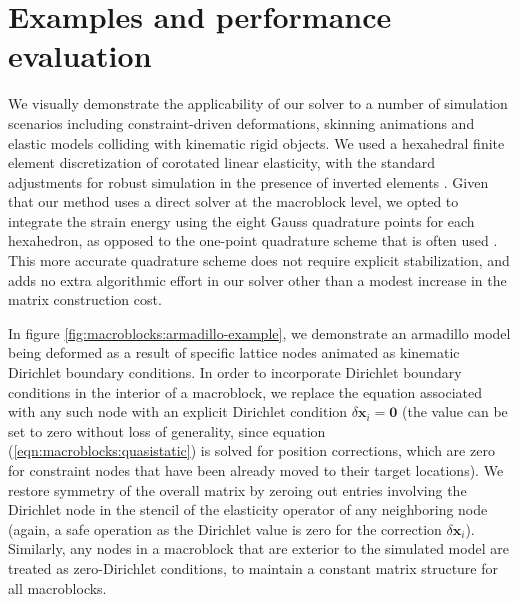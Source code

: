 
\section{Examples and performance evaluation}
\label{sec:macroblocks:examples}

We visually demonstrate the applicability of our solver to a number of
simulation scenarios including constraint-driven deformations,
skinning animations and elastic models colliding with kinematic rigid
objects.  We used a hexahedral finite element discretization of
corotated linear elasticity, with the standard adjustments for robust
simulation in the presence of inverted elements
\citep{IrvinTF:2004}. Given that our method uses a direct solver at the
macroblock level, we opted to integrate the strain energy using the
eight Gauss quadrature points for each hexahedron, as opposed to the
one-point quadrature scheme that is often used
\citep{McAdaZSETTS:2011,PatteMS:2012}. This more accurate quadrature
scheme does not require explicit stabilization, and adds no extra
algorithmic effort in our solver other than a modest increase in the
matrix construction cost.

In figure \ref{fig:macroblocks:armadillo-example}, we demonstrate an armadillo
model being deformed as a result of specific lattice nodes animated as
kinematic Dirichlet boundary conditions. In order to incorporate
Dirichlet boundary conditions in the interior of a macroblock, we
replace the equation associated with any such node with an explicit
Dirichlet condition $\delta\mathbf{x}_i=\mathbf{0}$ (the value can be
set to zero without loss of generality, since equation
(\ref{eqn:macroblocks:quasistatic}) is solved for position corrections, which are
zero for constraint nodes that have been already moved to their target
locations). We restore symmetry of the overall matrix by zeroing out
entries involving the Dirichlet node in the stencil of the elasticity
operator of any neighboring node (again, a safe operation as the
Dirichlet value is zero for the correction
$\delta\mathbf{x}_i$). Similarly, any nodes in a macroblock that are
exterior to the simulated model are treated as zero-Dirichlet
conditions, to maintain a constant matrix structure for all
macroblocks.

